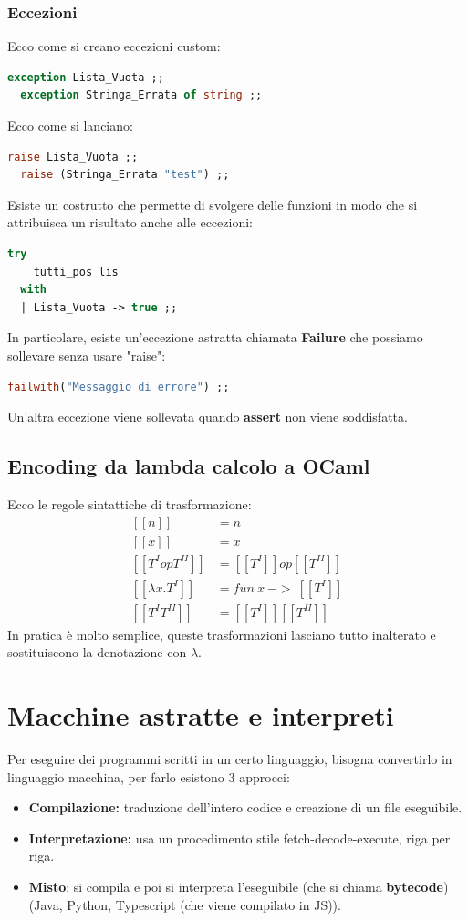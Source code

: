 \documentclass[12pt,a4paper]{article}
\let\oldsection\section
\renewcommand{\section}{\clearpage\oldsection}
\begin{document}
\subsubsection{Eccezioni}
Ecco come si creano eccezioni custom:
\begin{lstlisting}[language=OCaml]
  exception Lista_Vuota ;;
  exception Stringa_Errata of string ;;
\end{lstlisting}
Ecco come si lanciano:
\begin{lstlisting}[language=OCaml]
  raise Lista_Vuota ;;
  raise (Stringa_Errata "test") ;;
\end{lstlisting}
Esiste un costrutto che permette di svolgere delle funzioni in modo che si attribuisca un risultato anche alle eccezioni:
\begin{lstlisting}[language=OCaml]
  try
    tutti_pos lis
  with
  | Lista_Vuota -> true ;;
\end{lstlisting}
In particolare, esiste un'eccezione astratta chiamata \textbf{Failure} che possiamo sollevare senza usare "raise":
\begin{lstlisting}[language=OCaml]
  failwith("Messaggio di errore") ;;
\end{lstlisting}
Un'altra eccezione viene sollevata quando \textbf{assert} non viene soddisfatta.

\subsection{Encoding da lambda calcolo a OCaml}
Ecco le regole sintattiche di trasformazione:
\[
\begin{aligned}
[[n]] &= n\\
[[x]] &= x\\
[[T^I op T^{II}]] &= [[T^I]] op [[T^{II}]]\\
[[\lambda x.T^I]] &= fun\ x\ ->\ [[T^I]]\\
[[T^I T^{II}]] &= [[T^I]] [[T^{II}]]
\end{aligned}
\]
In pratica è molto semplice, queste trasformazioni lasciano tutto inalterato e sostituiscono la denotazione con $\lambda$.

\section{Macchine astratte e interpreti}
Per eseguire dei programmi scritti in un certo linguaggio, bisogna convertirlo in linguaggio macchina, per farlo esistono 3 approcci:
\begin{itemize}
  \item \textbf{Compilazione:} traduzione dell'intero codice e creazione di un file eseguibile.
  \item \textbf{Interpretazione:} usa un procedimento stile fetch-decode-execute, riga per riga.
  \item \textbf{Misto}: si compila e poi si interpreta l'eseguibile (che si chiama \textbf{bytecode}) (Java, Python, Typescript (che viene compilato in JS)).
\end{itemize}
\end{document}
